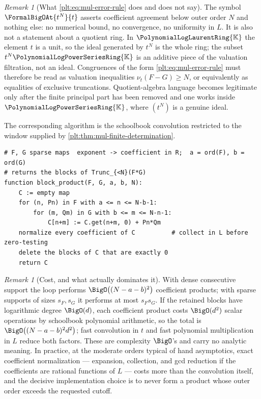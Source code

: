 \documentclass[11pt,oneside]{article}
\theoremstyle{plain}
\theoremstyle{definition}
\theoremstyle{remark}
\newtheorem{remark}[theorem]{Remark}
\newcommand{\K}{\mathbb{K}}
\newcommand{\PLpow}{\PolynomialLogPowerSeriesRing{\K}}   %
\newcommand{\PLlau}{\PolynomialLogLaurentRing{\K}}       %
\newcommand{\ordt}{\nu_{t}}                              %
\begin{document}
\begin{remark}[What \eqref{plt:eq:mul-error-rule} does and does not say]
\label{plt:rmk:mul-not-an-ideal}
The symbol $\FormalBigOAt{t^{N}}{t}$ asserts coefficient agreement below
outer order $N$ and nothing else: no numerical bound, no convergence, no
uniformity in $L$.  It is also not a statement about a quotient ring.  In
$\PLlau$ the element $t$ is a unit, so the ideal generated by $t^N$ is the
whole ring; the subset $t^N\PLpow$ is an additive piece of the
valuation filtration, not an ideal.  Congruences of the form
\eqref{plt:eq:mul-error-rule} must therefore be read as valuation
inequalities $\ordt(F-G)\ge N$, or equivalently as equalities of exclusive
truncations.  Quotient-algebra language becomes legitimate only after the
finite principal part has been removed and one works inside $\PLpow$, where
$(t^N)$ is a genuine ideal.
\end{remark}

The corresponding algorithm is the schoolbook convolution restricted to the
window supplied by \cref{plt:thm:mul-finite-determination}.

\begin{lstlisting}[style=pseudo,caption={Truncated block product},label={plt:alg:mul-truncated}]
# F, G sparse maps  exponent -> coefficient in R;  a = ord(F), b = ord(G)
# returns the blocks of Trunc_{<N}(F*G)
function block_product(F, G, a, b, N):
    C := empty map
    for (n, Pn) in F with a <= n <= N-b-1:
        for (m, Qm) in G with b <= m <= N-n-1:
            C[n+m] := C.get(n+m, 0) + Pn*Qm
    normalize every coefficient of C          # collect in L before zero-testing
    delete the blocks of C that are exactly 0
    return C
\end{lstlisting}

\begin{remark}[Cost, and what actually dominates it]
\label{plt:rmk:mul-cost}
With dense consecutive support the loop performs
$\BigO\bigl((N-a-b)^2\bigr)$ coefficient products; with sparse supports of
sizes $s_F,s_G$ it performs at most $s_Fs_G$.  If the retained blocks have
logarithmic degree $\BigO(d)$, each coefficient product costs
$\BigO(d^2)$ scalar operations by schoolbook polynomial arithmetic, so the
total is $\BigO\bigl((N-a-b)^2d^2\bigr)$; fast convolution in $t$ and fast
polynomial multiplication in $L$ reduce both factors.  These are complexity
$\BigO$'s and carry no analytic meaning.  In practice, at the moderate orders
typical of hand asymptotics, exact coefficient normalization --- expansion,
collection, and gcd reduction if the coefficients are rational functions of
$L$ --- costs more than the convolution itself, and the decisive
implementation choice is to never form a product whose outer order exceeds
the requested cutoff.
\end{remark}
\end{document}
